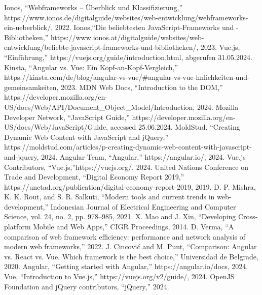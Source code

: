 \documentclass[conference]{IEEEtran}
\begin{document}
\begin{thebibliography}{00}
 Ionos, ``Webframeworks – Überblick und Klassifizierung,'' https://www.ionos.de/digitalguide/websites/web-entwicklung/webframeworks-ein-ueberblick/, 2022.
 Ionos,``Die beliebtesten JavaScript-Frameworks und -Bibliotheken,'' https://www.ionos.at/digitalguide/websites/web-entwicklung/beliebte-javascript-frameworks-und-bibliotheken/, 2023.
 Vue.js, ``Einführung,'' https://vuejs.org/guide/introduction.html, abgerufen 31.05.2024.
 Kinsta, ``Angular vs. Vue: Ein Kopf-an-Kopf-Vergleich,'' https://kinsta.com/de/blog/angular-vs-vue/\#angular-vs-vue-hnlichkeiten-und-gemeinsamkeiten, 2023.
 MDN Web Docs, ``Introduction to the DOM,'' https://developer.mozilla.org/en-US/docs/Web/API/Document\_Object\_Model/Introduction, 2024.
 Mozilla Developer Network, ``JavaScript Guide,'' https://developer.mozilla.org/en-US/docs/Web/JavaScript/Guide, accessed 25.06.2024.
 MoldStud, ``Creating Dynamic Web Content with JavaScript and jQuery,'' https://moldstud.com/articles/p-creating-dynamic-web-content-with-javascript-and-jquery, 2024.
 Angular Team, ``Angular,'' https://angular.io/, 2024.
 Vue.js Contributors, ``Vue.js,''https://vuejs.org/, 2024.
 United Nations Conference on Trade and Development, ``Digital Economy Report 2019,'' https://unctad.org/publication/digital-economy-report-2019, 2019.
 D. P. Mishra, K. K. Rout, and S. R. Salkuti, ``Modern tools and current trends in web-development,'' Indonesian Journal of Electrical Engineering and Computer Science, vol. 24, no. 2, pp. 978--985, 2021.
 X. Mao and J. Xin, ``Developing Cross-platform Mobile and Web Apps,'' CIGR Proceedings, 2014.
 D. Verma, ``A comparison of web framework efficiency: performance and network analysis of modern web frameworks,'' 2022.
 J. Cincović and M. Punt, ``Comparison: Angular vs. React vs. Vue. Which framework is the best choice,'' Universidad de Belgrade, 2020.
 Angular, ``Getting started with Angular,'' https://angular.io/docs, 2024.
 Vue, ``Introduction to Vue.js,'' https://vuejs.org/v2/guide/, 2024.
 OpenJS Foundation and jQuery contributors, ``jQuery,'' 2024.
\end{thebibliography}
\vspace{12pt}
\color{red}
\end{document}

